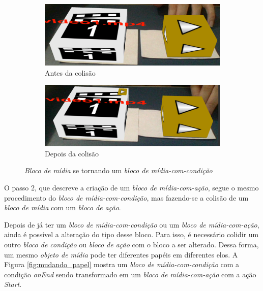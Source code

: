 \documentclass[../main.tex]{subfiles}
\begin{document}
\begin{figure}[!ht]
\centering
  \begin{subfigure}{0.49\linewidth}
    \includegraphics[width=0.95\linewidth]{IMG/beforeCondR.png}
    \caption{Antes da colisão}
  \end{subfigure}
  \begin{subfigure}{0.49\linewidth}
    \includegraphics[width=1\linewidth]{IMG/afterCondR.png}
    \caption{Depois da colisão}
  \end{subfigure}
  \caption{\textit{Bloco de mídia} se tornando um  \textit{bloco de mídia-com-condição}}
  \label{fig:midia_condicao}
\end{figure}

O passo 2, que descreve a criação de um \emph{bloco de mídia-com-ação}, segue o mesmo procedimento do \emph{bloco de mídia-com-condição}, mas fazendo-se a colisão de um \emph{bloco de mídia} com um \emph{bloco de ação}.

Depois de já ter um \emph{bloco de mídia-com-condição} ou um \emph{bloco de mídia-com-ação}, ainda é possível a alteração do tipo desse bloco. Para isso, é necessário colidir um outro \emph{bloco de condição} ou \emph{bloco de ação} com o bloco a ser alterado. Dessa forma, um mesmo \emph{objeto de mídia} pode ter diferentes papéis em diferentes elos. A Figura \ref{fig:mudando_papel} mostra um \emph{bloco de mídia-com-condição} com a condição \emph{onEnd} sendo transformado em um \emph{bloco de mídia-com-ação} com a ação \emph{Start}.
\end{document}
